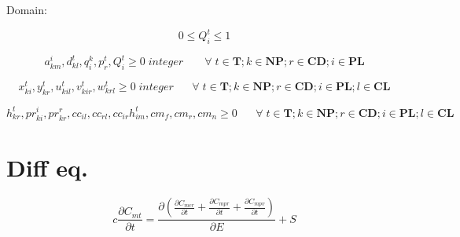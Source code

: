\documentclass{article}
\begin{document}
Domain:


\begin{equation}
0\leq{Q}_{i}^{t}\leq1
\label{r5}
\end{equation}

\begin{equation}
{a}_{km}^{i},{d}_{kl}^{t},{q}_{i}^{k},{p}_{r}^{t},{Q}_{i}^{t}\geq0\;integer\;\;\;\;\;\;\;
\forall\; t\in \textbf{T};k\in \textbf{NP};r\in \textbf{CD};i\in \textbf{PL}
\label{r6}
\end{equation}

\begin{equation}
{x}_{ki}^{t},{y}_{kr}^{t},{u}_{kil}^{t},{v}_{kir}^{t},{w}_{krl}^{t}\geq0\;integer\;\;\;\;\;\;
\forall\; t\in \textbf{T};k\in \textbf{NP};r\in \textbf{CD};i\in \textbf{PL};l\in \textbf{CL}
\label{r7}
\end{equation}

\begin{equation}
{h}_{kr}^{t},{pr}_{ki}^{i},{pr}_{kr}^{r},{cc}_{il},{cc}_{rl},{cc}_{ir}
{h}_{im}^{t},{cm}_{f},{cm}_{r},{cm}_{n}\geq0\;\;\;\;\;\;
\forall\; t\in \textbf{T};k\in \textbf{NP};r\in \textbf{CD};i\in \textbf{PL};l\in \textbf{CL}
\label{r7}
\end{equation}

\section{Diff eq.}
\begin{equation}
c\frac{\partial C_{mt}}{\partial t} =  \frac{\partial (\frac{\partial C_{mcr}}{\partial t}+\frac{\partial C_{mpr}}{\partial t}+\frac{\partial C_{mpv}}{\partial t})}{\partial E}+S
\end{equation}


  \nocite{*}
%    
\end{document}
